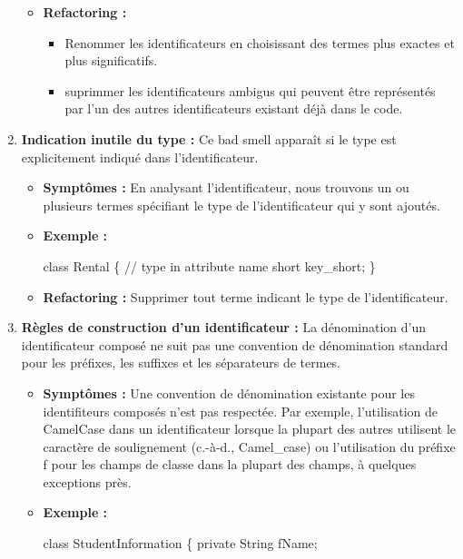 \begin{enumerate}
\begin{itemize}
  \item \textbf {Refactoring :}
  \begin{itemize}
\item Renommer les identificateurs en choisissant des termes plus exactes et plus significatifs.
\item suprimmer les identificateurs ambigus qui peuvent être représentés par l’un des autres identificateurs existant déjà dans le code.
\end{itemize}
\end{itemize}
\item \textbf {Indication inutile du type :}
Ce  bad smell apparaît si le type est explicitement indiqué dans l’identificateur.
\begin{itemize}
\item \textbf {Symptômes :}
En analysant l’identificateur, nous trouvons un ou plusieurs termes spécifiant le type de l’identificateur qui y sont  ajoutés.
\item \textbf {Exemple :}
\begin{framed}
{\selectfont
class Rental \{ \newline
// type in attribute name\newline
short key\_short;\newline
\}
}
\end{framed}
\item \textbf {Refactoring :}
Supprimer tout terme indicant le type de l’identificateur.
\end{itemize}
\item \textbf {Règles de construction d’un identificateur :}
La dénomination d'un identificateur composé ne suit pas une convention de dénomination standard pour les préfixes, les suffixes et les séparateurs de termes. 
\begin{itemize}
\item \textbf {Symptômes :}
Une convention de dénomination existante pour les identifiteurs composés n'est pas respectée. Par exemple, l'utilisation de CamelCase dans un identificateur lorsque la plupart des autres utilisent le caractère de soulignement (c.-à-d., Camel\_case) ou l'utilisation du préfixe f pour les champs de classe dans la plupart des champs, à quelques exceptions près. 
\item \textbf {Exemple :}
\begin{framed}
  {\selectfont  
class StudentInformation \{ \newline
   private String fName;\newline
}
\end{framed}
\end{itemize}
\end{enumerate}
